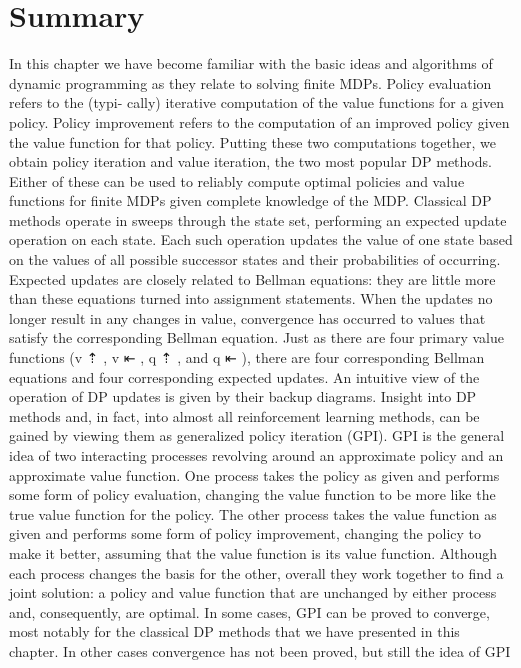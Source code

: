 \section{Summary}
In this chapter we have become familiar with the basic ideas and algorithms of dynamic
programming as they relate to solving finite MDPs. Policy evaluation refers to the (typi-
cally) iterative computation of the value functions for a given policy. Policy improvement
refers to the computation of an improved policy given the value function for that policy.
Putting these two computations together, we obtain policy iteration and value iteration,
the two most popular DP methods. Either of these can be used to reliably compute
optimal policies and value functions for finite MDPs given complete knowledge of the
MDP.
Classical DP methods operate in sweeps through the state set, performing an expected
update operation on each state. Each such operation updates the value of one state
based on the values of all possible successor states and their probabilities of occurring.
Expected updates are closely related to Bellman equations: they are little more than
these equations turned into assignment statements. When the updates no longer result in
any changes in value, convergence has occurred to values that satisfy the corresponding
Bellman equation. Just as there are four primary value functions (v ⇡ , v ⇤ , q ⇡ , and q ⇤ ),
there are four corresponding Bellman equations and four corresponding expected updates.
An intuitive view of the operation of DP updates is given by their backup diagrams.
Insight into DP methods and, in fact, into almost all reinforcement learning methods,
can be gained by viewing them as generalized policy iteration (GPI). GPI is the general idea
of two interacting processes revolving around an approximate policy and an approximate
value function. One process takes the policy as given and performs some form of policy
evaluation, changing the value function to be more like the true value function for the
policy. The other process takes the value function as given and performs some form
of policy improvement, changing the policy to make it better, assuming that the value
function is its value function. Although each process changes the basis for the other,
overall they work together to find a joint solution: a policy and value function that are
unchanged by either process and, consequently, are optimal. In some cases, GPI can be
proved to converge, most notably for the classical DP methods that we have presented in
this chapter. In other cases convergence has not been proved, but still the idea of GPI
